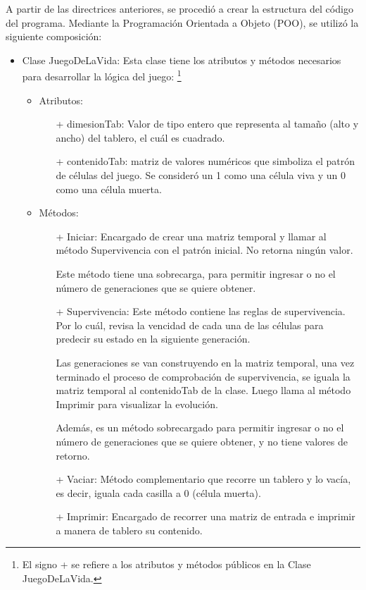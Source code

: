 \documentclass[12pt,letterpaper]{article}
\begin{document}
A partir de las directrices anteriores, se procedió a crear la estructura del código del programa. Mediante la Programación Orientada a Objeto (POO), se utilizó la siguiente composición: 
\begin{itemize}
\item Clase JuegoDeLaVida: Esta clase tiene los atributos y métodos necesarios para desarrollar la lógica del juego:
\footnote{El signo + se refiere a los atributos y métodos públicos en la Clase JuegoDeLaVida.}
  \begin{itemize}
  \item Atributos:
      \begin{itemize}
      \item [+] dimesionTab: Valor de tipo entero que representa al tamaño (alto y ancho) del tablero, el cuál es cuadrado.
      \item [+] contenidoTab: matriz de valores numéricos que simboliza el patrón de células del juego. Se consideró un 1 como una célula viva y un 0 como una célula muerta.
      \end{itemize}
  \item Métodos:
  	\begin{itemize}
  	\item [+] Iniciar: Encargado de crear una matriz temporal y llamar al método Supervivencia con el patrón inicial. No retorna ningún valor.
    
    Este método tiene una sobrecarga, para permitir ingresar o no el número de generaciones que se quiere obtener.
    \item [+] Supervivencia: Este método contiene las reglas de supervivencia. Por lo cuál, revisa la vencidad de cada una de las células para predecir su estado en la siguiente generación. 
    
    Las generaciones se van construyendo en la matriz temporal, una vez terminado el proceso de comprobación de supervivencia, se iguala la matriz temporal al contenidoTab de la clase. Luego llama al método Imprimir para visualizar la evolución.
   
   Además, es un método sobrecargado para permitir ingresar o no el número de generaciones que se quiere obtener, y no tiene valores de retorno.
   
    \item [+] Vaciar: Método complementario que recorre un tablero y lo vacía, es decir, iguala cada casilla a 0 (célula muerta).
    \item [+] Imprimir: Encargado de recorrer una matriz de entrada e imprimir a manera de tablero su contenido.
  	\end{itemize}
  \end{itemize}
\end{itemize}
\end{document}
